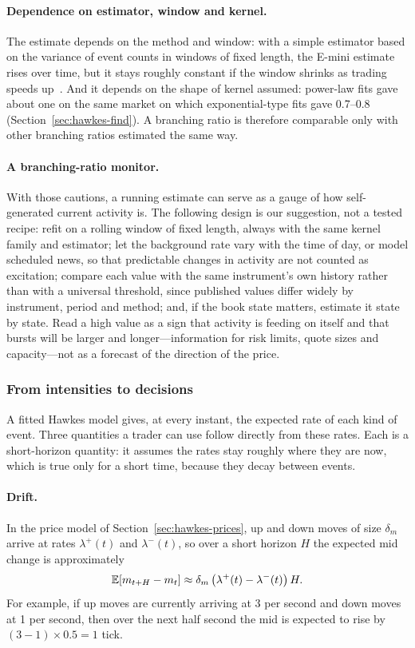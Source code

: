 \paragraph{Dependence on estimator, window and kernel.} The estimate depends on the method and window: with a simple estimator based on
the variance of event counts in windows of fixed length, the E-mini estimate rises over time, but it stays roughly
constant if the window shrinks as trading speeds up~\citep{hardiman2014branching}. And it depends on the shape of
kernel assumed: power-law fits gave about one on the same market on which exponential-type fits gave 0.7--0.8
(Section~\ref{sec:hawkes-find}). A branching ratio is therefore comparable only with other branching ratios
estimated the same way.

\paragraph{A branching-ratio monitor.} With those cautions, a running estimate can serve as a gauge of how
self-generated current activity is. The following design is our suggestion, not a tested recipe: refit on a
rolling window of fixed length, always with the same kernel family and estimator; let the background rate vary
with the time of day, or model scheduled news, so that predictable changes in activity are not counted as
excitation; compare each value with the same instrument's own history rather than with a universal threshold,
since published values differ widely by instrument, period and method; and, if the book state matters, estimate it
state by state. Read a high value as a sign that activity is feeding on itself and that bursts will be larger and
longer---information for risk limits, quote sizes and capacity---not as a forecast of the direction of the
price.

\subsubsection{From intensities to decisions}
\label{sec:hawkes-decisions}

A fitted Hawkes model gives, at every instant, the expected rate of each kind of event. Three quantities a
trader can use follow directly from these rates. Each is a short-horizon quantity: it assumes the rates stay roughly
where they are now, which is true only for a short time, because they decay between events.

\paragraph{Drift.} In the price model of Section~\ref{sec:hawkes-prices}, up and down moves of size
$\delta_m$ arrive at rates $\lambda^+(t)$ and $\lambda^-(t)$, so over a short horizon $H$ the expected
mid change is approximately
\[
  \mathbb{E}[m_{t+H} - m_t] \approx \delta_m\,\big(\lambda^+(t) - \lambda^-(t)\big)\, H .
\]
 For example, if up moves are currently arriving at 3 per second and down moves at 1 per second,
then over the next half second the mid is expected to rise by $(3-1)\times 0.5 = 1$ tick.

